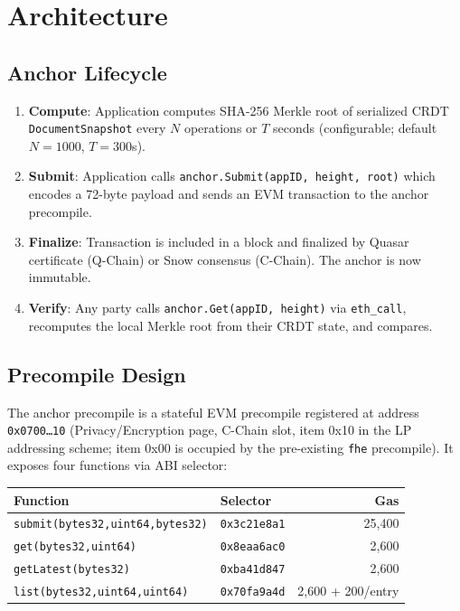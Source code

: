 \documentclass[11pt,a4paper]{article}
\begin{document}
\section{Architecture}
\label{sec:architecture}

\subsection{Anchor Lifecycle}

\begin{enumerate}[nosep]
  \item \textbf{Compute}: Application computes SHA-256 Merkle root of
        serialized CRDT \texttt{DocumentSnapshot} every $N$ operations or
        $T$ seconds (configurable; default $N=1000$, $T=300$s).
  \item \textbf{Submit}: Application calls
        \texttt{anchor.Submit(appID, height, root)} which encodes a
        72-byte payload and sends an EVM transaction to the anchor
        precompile.
  \item \textbf{Finalize}: Transaction is included in a block and
        finalized by Quasar certificate (Q-Chain) or Snow consensus
        (C-Chain). The anchor is now immutable.
  \item \textbf{Verify}: Any party calls \texttt{anchor.Get(appID, height)}
        via \texttt{eth\_call}, recomputes the local Merkle root from their
        CRDT state, and compares.
\end{enumerate}

\subsection{Precompile Design}

The anchor precompile is a stateful EVM precompile registered at address
\texttt{0x0700\ldots10} (Privacy/Encryption page, C-Chain slot, item 0x10
in the LP addressing scheme; item 0x00 is occupied by the pre-existing
\texttt{fhe} precompile). It exposes four functions via ABI selector:

\begin{center}
\begin{tabular}{llr}
\toprule
\textbf{Function} & \textbf{Selector} & \textbf{Gas} \\
\midrule
\texttt{submit(bytes32,uint64,bytes32)} & \texttt{0x3c21e8a1} & 25,400 \\
\texttt{get(bytes32,uint64)} & \texttt{0x8eaa6ac0} & 2,600 \\
\texttt{getLatest(bytes32)} & \texttt{0xba41d847} & 2,600 \\
\texttt{list(bytes32,uint64,uint64)} & \texttt{0x70fa9a4d} & 2,600 + 200/entry \\
\bottomrule
\end{tabular}
\end{center}
\end{document}
